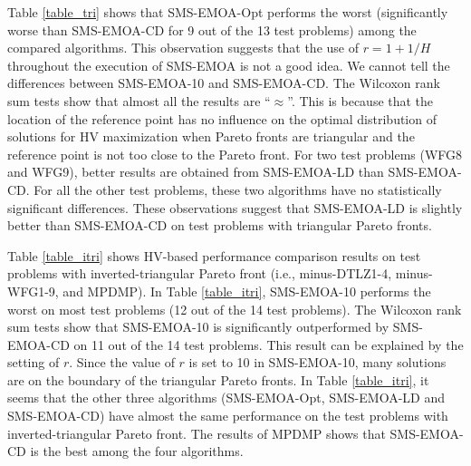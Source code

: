 \documentclass[conference]{IEEEtran}
\begin{document}
Table \ref{table_tri} shows that SMS-EMOA-Opt performs the worst (significantly worse than SMS-EMOA-CD for 9 out of the 13 test problems) among the compared algorithms. 
This observation suggests that the use of $r = 1 + 1/H$ throughout the execution of SMS-EMOA is not a good idea. 
We cannot tell the differences between SMS-EMOA-10 and SMS-EMOA-CD.
The Wilcoxon rank sum tests show that almost all the results are ``$\approx$''. 
This is because that the location of the reference point has no influence on the optimal distribution of solutions for HV maximization when Pareto fronts are triangular 
and the reference point is not too close to the Pareto front. 
For two test problems (WFG8 and WFG9), better results are obtained from SMS-EMOA-LD than SMS-EMOA-CD. 
For all the other test problems, these two algorithms have no statistically significant differences.
These observations suggest that SMS-EMOA-LD is slightly better than SMS-EMOA-CD on test problems with triangular Pareto fronts. 

Table \ref{table_itri} shows HV-based performance comparison results on test problems with inverted-triangular Pareto front
(i.e., minus-DTLZ1-4, minus-WFG1-9, and MPDMP). 
In Table \ref{table_itri}, SMS-EMOA-10 performs the worst on most test problems (12 out of the 14 test problems).
The Wilcoxon rank sum tests show that SMS-EMOA-10 is significantly outperformed by SMS-EMOA-CD on 11 out of the 14 test problems.
This result can be explained by the setting of $r$. Since the value of $r$ is set to 10 in SMS-EMOA-10, many solutions are on the boundary of the triangular Pareto fronts. 
In Table \ref{table_itri}, it seems that the other three algorithms (SMS-EMOA-Opt, SMS-EMOA-LD and SMS-EMOA-CD) have almost the same performance on the test problems with inverted-triangular
Pareto front. The results of MPDMP shows that
SMS-EMOA-CD is the best among the four algorithms. 
\end{document}
